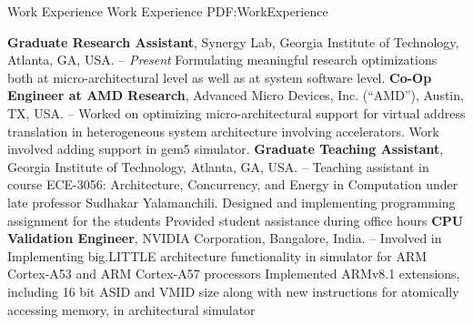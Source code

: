 \documentclass[letterpaper,MMMyyyy,nonstopmode]{simpleresumecv}
\begin{document}
\begin{Body}
%
%


\Section
{Work Experience}
{Work Experience}
{PDF:WorkExperience}

\Entry
{\textbf{Graduate Research Assistant}},
Synergy Lab, Georgia Institute of Technology, Atlanta, GA, USA.
\Gap
\hfill
{} --
\textit{Present}
\SubBulletItem
Formulating meaningful research optimizations both at micro-architectural level as well as at system software level.
\Gap
\Entry
{\textbf{Co-Op Engineer at AMD Research}},
Advanced Micro Devices, Inc. (“AMD”), Austin, TX, USA.
\Gap
\hfill
{} --
\SubBulletItem
Worked on optimizing micro-architectural support for virtual address translation in heterogeneous system architecture involving accelerators. Work involved adding support in gem5 simulator.
\Gap
\Entry
{\textbf{Graduate Teaching Assistant}},
Georgia Institute of Technology, Atlanta, GA, USA.
\Gap
\hfill
{} --
\SubBulletItem
Teaching assistant in course ECE-3056: Architecture, Concurrency, and Energy in Computation under late professor Sudhakar Yalamanchili.
\SubBulletItem
Designed and implementing programming assignment for the students
\SubBulletItem
Provided student assistance during office hours
\Gap
\Entry
{\textbf{CPU Validation Engineer}},
NVIDIA Corporation, Bangalore, India.
\hfill
{} --
\SubBulletItem
Involved in Implementing big.LITTLE architecture functionality in simulator for ARM Cortex-A53 and
ARM Cortex-A57 processors
\SubBulletItem
Implemented ARMv8.1 extensions, including 16 bit ASID and VMID size along with new instructions
for atomically accessing memory, in architectural simulator
\vspace{-2mm}


\end{Body}
\end{document}
